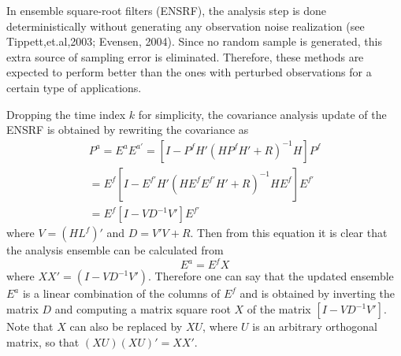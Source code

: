 \documentclass[a4paper,12pt]{article}
\begin{document}
       In ensemble square-root filters (ENSRF), the analysis step is done
       deterministically without generating any observation noise realization
       (see Tippett,et.al,2003; Evensen, 2004). Since no random sample is
       generated, this extra source of sampling error is eliminated. Therefore,
       these methods are expected to perform better than the ones with
       perturbed observations for a certain type of applications.

       Dropping the time index $k$ for simplicity, the covariance analysis update of the ENSRF is obtained by rewriting the covariance as 
       \begin{eqnarray}
          P^a = E^a E^{a'}=[I-P^f H'(H P^f H' + R)^{-1} H]P^f \\
          = E^f[I-E^{f'}H'(HE^f E^{f'}H'+R)^{-1}HE^f] E^{f'} \\
          = E^f [I- V D^{-1} V'] E^{f'}
       \end{eqnarray}
       where $V=(HL^f)'$ and $D=V' V + R$. Then from this equation it is clear that the analysis ensemble can be calculated from
       \begin{equation}
       \label{eq.ENSRF_EX}
           E^a = E^f X
       \end{equation}
       where $X X'=(I-V D^{-1} V')$. Therefore one can say that the updated ensemble $E^a$ is a linear combination of the columns of $E^f$ and is obtained by inverting the matrix $D$ and computing a matrix square root $X$ of the matrix $[I- V D^{-1} V']$. Note that $X$ can also be replaced by $XU$, where $U$ is an arbitrary orthogonal matrix, so that $(XU)(XU)'=XX'$.
\end{document}
